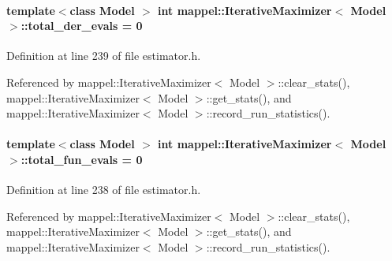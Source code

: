 \paragraph[{\texorpdfstring{total\+\_\+der\+\_\+evals}{total_der_evals}}]{\setlength{\rightskip}{0pt plus 5cm}template$<$class Model $>$ int {\bf mappel\+::\+Iterative\+Maximizer}$<$ Model $>$\+::total\+\_\+der\+\_\+evals = 0\hspace{0.3cm}{\ttfamily [protected]}}\hypertarget{classmappel_1_1IterativeMaximizer_a76de3653a5f2c200ad6865372eb9c154}{}\label{classmappel_1_1IterativeMaximizer_a76de3653a5f2c200ad6865372eb9c154}


Definition at line 239 of file estimator.\+h.



Referenced by mappel\+::\+Iterative\+Maximizer$<$ Model $>$\+::clear\+\_\+stats(), mappel\+::\+Iterative\+Maximizer$<$ Model $>$\+::get\+\_\+stats(), and mappel\+::\+Iterative\+Maximizer$<$ Model $>$\+::record\+\_\+run\+\_\+statistics().

\paragraph[{\texorpdfstring{total\+\_\+fun\+\_\+evals}{total_fun_evals}}]{\setlength{\rightskip}{0pt plus 5cm}template$<$class Model $>$ int {\bf mappel\+::\+Iterative\+Maximizer}$<$ Model $>$\+::total\+\_\+fun\+\_\+evals = 0\hspace{0.3cm}{\ttfamily [protected]}}\hypertarget{classmappel_1_1IterativeMaximizer_afbb76db27b845efa8e958611dd3c8d3c}{}\label{classmappel_1_1IterativeMaximizer_afbb76db27b845efa8e958611dd3c8d3c}


Definition at line 238 of file estimator.\+h.



Referenced by mappel\+::\+Iterative\+Maximizer$<$ Model $>$\+::clear\+\_\+stats(), mappel\+::\+Iterative\+Maximizer$<$ Model $>$\+::get\+\_\+stats(), and mappel\+::\+Iterative\+Maximizer$<$ Model $>$\+::record\+\_\+run\+\_\+statistics().

